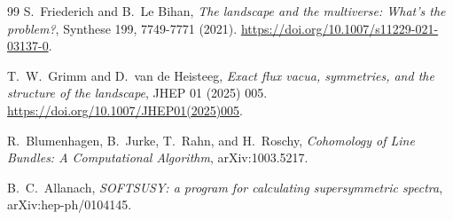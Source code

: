 \documentclass[11pt]{article}
\theoremstyle{remark}
\theoremstyle{plain}
\begin{document}
\begin{thebibliography}{99}
S.\ Friederich and B.\ Le Bihan,
\emph{The landscape and the multiverse: What's the problem?},
Synthese 199, 7749-7771 (2021).
\url{https://doi.org/10.1007/s11229-021-03137-0}.

T.\ W.\ Grimm and D.\ van de Heisteeg,
\emph{Exact flux vacua, symmetries, and the structure of the landscape},
JHEP 01 (2025) 005.
\url{https://doi.org/10.1007/JHEP01(2025)005}.

R.\ Blumenhagen, B.\ Jurke, T.\ Rahn, and H.\ Roschy,
\emph{Cohomology of Line Bundles: A Computational Algorithm},
arXiv:1003.5217.

B.\ C.\ Allanach,
\emph{SOFTSUSY: a program for calculating supersymmetric spectra},
arXiv:hep-ph/0104145.

\end{thebibliography}
\end{document}
